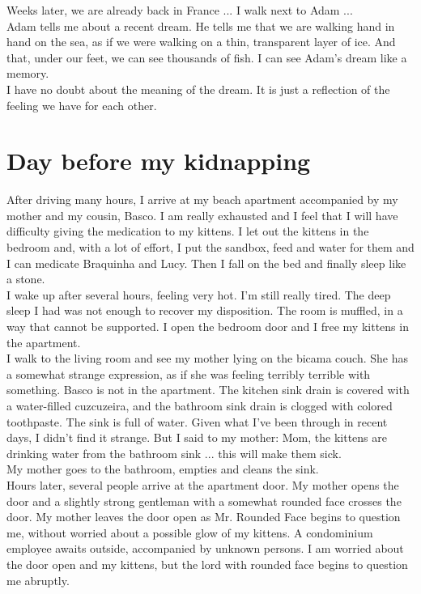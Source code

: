 \documentclass[11pt]{book}
\begin{document}
\noindent Weeks later, we are already back in France ... I walk next to Adam ... \\

\noindent Adam tells me about a recent dream. He tells me that we are walking hand in hand on the sea, as if we were walking on a thin, transparent layer of ice. And that, under our feet, we can see thousands of fish. I can see Adam's dream like a memory. \\

\noindent I have no doubt about the meaning of the dream. It is just a reflection of the feeling we have for each other.

\chapter{Day before my kidnapping}

\noindent After driving many hours, I arrive at my beach apartment accompanied by my mother and my cousin, Basco. I am really exhausted and I feel that I will have difficulty giving the medication to my kittens. I let out the kittens in the bedroom and, with a lot of effort, I put the sandbox, feed and water for them and I can medicate Braquinha and Lucy. Then I fall on the bed and finally sleep like a stone. \\

\noindent I wake up after several hours, feeling very hot. I'm still really tired. The deep sleep I had was not enough to recover my disposition. The room is muffled, in a way that cannot be supported. I open the bedroom door and I free my kittens in the apartment.  \\

\noindent I walk to the living room and see my mother lying on the bicama couch. She has a somewhat strange expression, as if she was feeling terribly terrible with something. Basco is not in the apartment. The kitchen sink drain is covered with a water-filled cuzcuzeira, and the bathroom sink drain is clogged with colored toothpaste. The sink is full of water. Given what I've been through in recent days, I didn't find it strange. But I said to my mother: Mom, the kittens are drinking water from the bathroom sink ... this will make them sick.  \\

\noindent My mother goes to the bathroom, empties and cleans the sink. \\

\noindent Hours later, several people arrive at the apartment door. My mother opens the door and a slightly strong gentleman with a somewhat rounded face crosses the door. My mother leaves the door open as Mr. Rounded Face begins to question me, without worried about a possible glow of my kittens. A condominium employee awaits outside, accompanied by unknown persons. I am worried about the door open and my kittens, but the lord with rounded face begins to question me abruptly. \\
\end{document}
